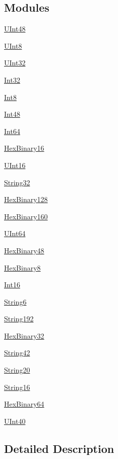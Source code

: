 \subsection*{Modules}
\begin{DoxyCompactItemize}
\item 
\hyperlink{group__UInt48}{U\+Int48}
\item 
\hyperlink{group__UInt8}{U\+Int8}
\item 
\hyperlink{group__UInt32}{U\+Int32}
\item 
\hyperlink{group__Int32}{Int32}
\item 
\hyperlink{group__Int8}{Int8}
\item 
\hyperlink{group__Int48}{Int48}
\item 
\hyperlink{group__Int64}{Int64}
\item 
\hyperlink{group__HexBinary16}{Hex\+Binary16}
\item 
\hyperlink{group__UInt16}{U\+Int16}
\item 
\hyperlink{group__String32}{String32}
\item 
\hyperlink{group__HexBinary128}{Hex\+Binary128}
\item 
\hyperlink{group__HexBinary160}{Hex\+Binary160}
\item 
\hyperlink{group__UInt64}{U\+Int64}
\item 
\hyperlink{group__HexBinary48}{Hex\+Binary48}
\item 
\hyperlink{group__HexBinary8}{Hex\+Binary8}
\item 
\hyperlink{group__Int16}{Int16}
\item 
\hyperlink{group__String6}{String6}
\item 
\hyperlink{group__String192}{String192}
\item 
\hyperlink{group__HexBinary32}{Hex\+Binary32}
\item 
\hyperlink{group__String42}{String42}
\item 
\hyperlink{group__String20}{String20}
\item 
\hyperlink{group__String16}{String16}
\item 
\hyperlink{group__HexBinary64}{Hex\+Binary64}
\item 
\hyperlink{group__UInt40}{U\+Int40}
\end{DoxyCompactItemize}


\subsection{Detailed Description}
